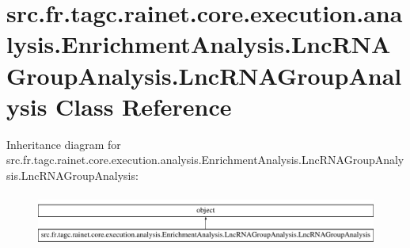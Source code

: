 \hypertarget{classsrc_1_1fr_1_1tagc_1_1rainet_1_1core_1_1execution_1_1analysis_1_1EnrichmentAnalysis_1_1LncRNe08e6e334d3ac6c2229a1d8a0df9192a}{\section{src.\-fr.\-tagc.\-rainet.\-core.\-execution.\-analysis.\-Enrichment\-Analysis.\-Lnc\-R\-N\-A\-Group\-Analysis.\-Lnc\-R\-N\-A\-Group\-Analysis Class Reference}
\label{classsrc_1_1fr_1_1tagc_1_1rainet_1_1core_1_1execution_1_1analysis_1_1EnrichmentAnalysis_1_1LncRNe08e6e334d3ac6c2229a1d8a0df9192a}
}
Inheritance diagram for src.\-fr.\-tagc.\-rainet.\-core.\-execution.\-analysis.\-Enrichment\-Analysis.\-Lnc\-R\-N\-A\-Group\-Analysis.\-Lnc\-R\-N\-A\-Group\-Analysis\-:\begin{figure}[H]
\begin{center}
\leavevmode
\includegraphics[height=1.761006cm]{classsrc_1_1fr_1_1tagc_1_1rainet_1_1core_1_1execution_1_1analysis_1_1EnrichmentAnalysis_1_1LncRNe08e6e334d3ac6c2229a1d8a0df9192a}
\end{center}
\end{figure}
